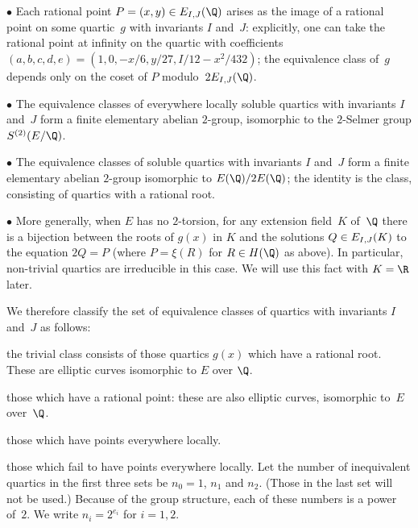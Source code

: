 $\bullet$ Each rational point $P=(x,y)\in\EIJQ$ arises as the image of a
rational point on some quartic~$g$ with invariants $I$ and~$J$:
explicitly, one can take the rational point at infinity on the quartic
with coefficients $(a,b,c,d,e)=(1,0,-x/6,y/27,I/12-x^2/432)$;  the
equivalence class of~$g$ depends only on the coset of $P$
modulo~$2\EIJQ$. 

$\bullet$ The equivalence classes of everywhere locally soluble
quartics with invariants $I$ and~$J$ form a finite elementary abelian
$2$-group, isomorphic to the $2$-Selmer group $S^{(2)}(E/\Q)$.

$\bullet$ The equivalence classes of soluble quartics with invariants
$I$ and~$J$ form a finite elementary abelian $2$-group isomorphic to
$E(\Q)/2E(\Q)$; the identity is the  class, consisting of
quartics with a rational root.

$\bullet$ More generally, when $E$ has no $2$-torsion, for any
extension field~$K$ of~$\Q$ there is a bijection between the roots of
$g(x)$ in $K$ and the solutions $Q\in E_{I,J}(K)$ to the equation $2Q=P$
(where $P=\xi(R)$ for $R\in H(\Q)$ as above).  In particular,
non-trivial quartics are irreducible in this case.  We will use this
fact with $K=\R$ later.

We therefore classify the set of equivalence classes of quartics with
invariants $I$ and~$J$ as follows:
\roster
\item[0] the trivial class consists of those quartics $g(x)$ which
have a rational root. These are elliptic curves isomorphic to $E$ over
$\Q$.
\item those which have a rational point: these are also elliptic curves, 
isomorphic to~$E$ over~$\Q$.
\item those which have points everywhere locally.
\item those which fail to have points everywhere locally.
\endroster
Let the number of inequivalent quartics in the first three sets be
$n_0=1$, $n_1$ and $n_2$.  (Those in the last set will not be used.)
Because of the group structure, each of these numbers is a power
of~$2$.  We write $n_i=2^{e_i}$ for $i=1,2$.

